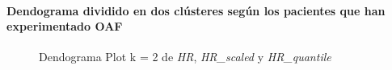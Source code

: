 \paragraph{Dendograma dividido en dos clústeres según los pacientes que han experimentado OAF}

\begin{figure}[H]
    \centering
    \caption{Dendograma Plot k = 2 de \textit{HR}, \textit{HR\_scaled} y \textit{HR\_quantile}}\label{fig:raw_data_ctg_fc}
\end{figure}


